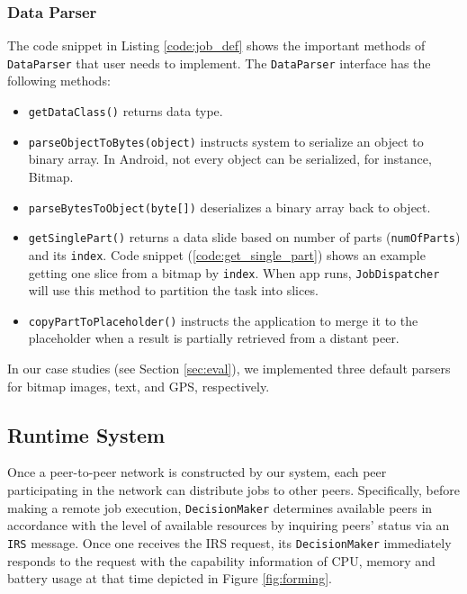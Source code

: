 \documentclass{sig-alternate}[10pt]
\begin{document}
\begin{CCSXML}
\subsubsection{Data Parser} \label{data_parser}
The code snippet in Listing \ref{code:job_def} shows the important methods of \texttt{DataParser} that user needs to implement. The \texttt{DataParser} interface has the following methods:
\begin{itemize}
	\item \texttt{getDataClass()} returns data type.
	\item \texttt{parseObjectToBytes(object)} instructs system to serialize an object to binary array. In Android, not every object can be serialized, for instance, Bitmap.  
	\item \texttt{parseBytesToObject(byte[])} deserializes a binary array back to object.
	\item \texttt{getSinglePart()} returns a data slide based on number of parts (\texttt{numOfParts}) and its \texttt{index}. Code snippet (\ref{code:get_single_part}) shows an example getting one slice from a bitmap by \texttt{index}. When app runs, \texttt{JobDispatcher} will use this method to partition the task into slices.
	\item \texttt{copyPartToPlaceholder()} instructs the application to merge it to the placeholder when a result is partially retrieved from a distant peer.
\end{itemize}

In our case studies (see Section \ref{sec:eval}), we implemented three default parsers for bitmap images, text, and GPS, respectively. 

\subsection{Runtime System} \label{scheduling}
Once a peer-to-peer network is constructed by our system, each peer participating in the network can distribute jobs to other peers. Specifically, before making a remote job execution, \texttt{DecisionMaker} determines available peers in accordance with the level of available resources by inquiring peers' status via an \texttt{IRS} message. Once one receives the IRS request, its \texttt{DecisionMaker} immediately responds to the request with the capability information of CPU, memory and battery usage at that time depicted in Figure \ref{fig:forming}.



\end{CCSXML}
\end{document}
